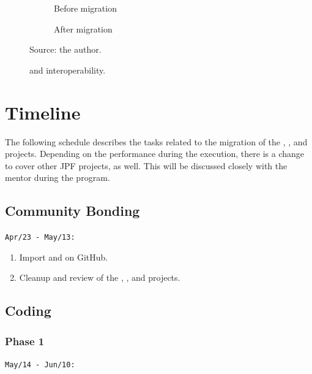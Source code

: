 \documentclass{article}
\begin{document}
\clearpage

\begin{figure}[t!]
    \centering
    \begin{subfigure}[b]{0.45\textwidth}
        
        \caption{Before migration}
    \end{subfigure}
    \hfill
    \begin{subfigure}[b]{0.45\textwidth}
        
        \caption{After migration}
    \end{subfigure}
    \caption{\ant{} and \gradle{} interoperability.\label{fig:gradle-ant-dep}}
    {\scriptsize Source: the author.}
\end{figure}

\section{Timeline}
\label{sec:time}

The following schedule describes the tasks related to the migration of the
\jpfcore{}, \jpfsymbc{}, and \jpftemplate{} projects.
Depending on the performance during the execution, there is a change to cover
other JPF projects, as well.
This will be discussed closely with the mentor during the program.

\subsection*{Community Bonding}

\noindent\texttt{Apr/23 - May/13:}

\begin{enumerate}
\item Import \jpfsymbc{} and \jpftemplate{} on GitHub.
\item Cleanup and review of the \jpfcore, \jpfsymbc, and \jpftemplate{}
      projects.
\end{enumerate}

\subsection*{Coding}
\subsubsection*{Phase 1}
\noindent\texttt{May/14 - Jun/10:}
\end{document}
